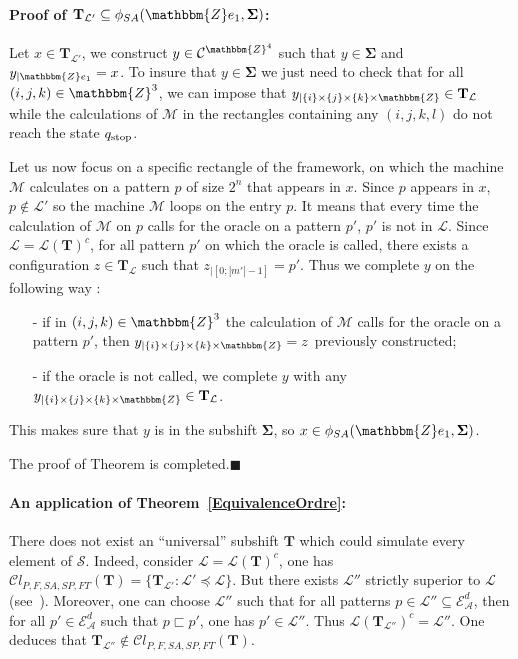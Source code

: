 \documentclass[proceedings]{stacs}
\theoremstyle{plain}\newtheorem{satz}[thm]{Satz}
\theoremstyle{definition}\newtheorem{crucial}[thm]{Crucial Definition}
\newcommand{\Z}{\mathbbm{Z}}
\newcommand{\A}{\mathcal{A}}
\newcommand{\E}{\mathcal{E}}
\newcommand{\T}{\mathbf{T}}
\newcommand{\Tfinal}{\mathbf{\Sigma}}
\newcommand{\TM}{\mathcal{M}}
\newcommand{\shift}{\mathcal{S}}
\newcommand{\Lang}{\mathcal{L}}
\begin{document}
\paragraph{Proof of $\T_{\Lang'} \subseteq \phi_{SA}(\Z e_1, \Tfinal)$:}

Let $x\in \T_{\Lang'}$, we construct $y\in\mathcal{C}^{\Z^4}$ such that  $y\in \Tfinal$ and $y_{|\Z e_1}=x$. To insure that $y\in\Tfinal$ we just need to check that for all $(i,j,k)\in\Z^3$, we can impose that $y_{| \{ i \} \times\{ j \}\times \{ k \} \times \Z} \in \T_\Lang$ while the calculations of $\TM$ in the rectangles containing any $(i,j,k,l)$ do not reach the state $q_{\text{\textrm{stop}}}$.

Let us now focus on a specific rectangle of the framework, on which the machine $\TM$ calculates on a pattern $p$ of size $2^n$ that appears in $x$. Since $p$ appears in $x$, $p\notin \Lang'$ so the machine $\TM$ loops on the entry $p$. It means that every time the calculation of $\TM$ on $p$ calls for the oracle on a pattern $p'$, $p'$ is not in $\Lang$. Since $\Lang=\Lang(\T)^c$, for all pattern $p'$ on which the oracle is called, there exists a configuration $z\in \T_\Lang$ such that $z_{|[0;|m'|-1]}=p'$. Thus we complete $y$ on the following way :
\begin{itemize}
\item[-] if in $(i,j,k)\in\Z^3$ the calculation of $\TM$ calls for the oracle on a pattern $p'$, then $y_{| \{ i \} \times\{ j \}\times \{ k \} \times \Z}=z$ previously constructed;
\item[-] if the oracle is not called, we complete $y$ with any $y_{| \{ i \} \times\{ j \}\times \{ k \} \times \mathbbm{Z}} \in \T_\Lang$.
\end{itemize}
This makes sure that $y$ is in the subshift $\Tfinal$, so $x\in\phi_{SA}(\Z e_1,\Tfinal)$.

\vspace{0.2cm}

The proof of Theorem is completed.\hfill{\tiny $\blacksquare$}



\paragraph{\textbf{An application of Theorem~\ref{EquivalenceOrdre}:}}
 There does not exist an ``universal'' subshift $\T$ which could simulate every element of $\shift$. Indeed, consider $\Lang=\Lang(\T)^c$, one has $\mathcal{C}l_{P,F,SA,SP,FT}(\T)=\{ \T_{\Lang'} : \Lang'\preceq \Lang\}$. But there exists $\Lang''$ strictly superior to $\Lang$ (see~\cite{rogersjr1987trf}). Moreover, one can choose $\Lang''$ such that for all patterns $p\in\Lang''\subseteq\E^d_{\A}$, then for all $p'\in\E^d_{\A}$ such that $p\sqsubset p'$, one has $p'\in\Lang''$. Thus $\Lang(\T_{\Lang''})^c=\Lang''$. One deduces that $\T_{\Lang''}\notin\mathcal{C}l_{P,F,SA,SP,FT}(\T)$.
\end{document}
